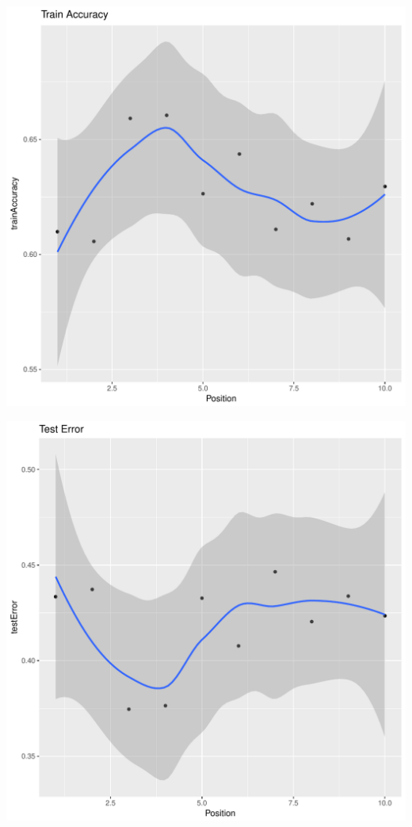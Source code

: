 \documentclass{article}\usepackage[]{graphicx}\usepackage[]{color}
\makeatletter
\def\maxwidth{ %
  \ifdim\Gin@nat@width>\linewidth
    \linewidth
  \else
    \Gin@nat@width
  \fi
}
\newenvironment{kframe}{%
 \def\at@end@of@kframe{}%
 \ifinner\ifhmode%
  \def\at@end@of@kframe{\end{minipage}}%
  \begin{minipage}{\columnwidth}%
 \fi\fi%
 \def\FrameCommand##1{\hskip\@totalleftmargin \hskip-\fboxsep
 \colorbox{shadecolor}{##1}\hskip-\fboxsep
     \hskip-\linewidth \hskip-\@totalleftmargin \hskip\columnwidth}%
 \MakeFramed {\advance\hsize-\width
   \@totalleftmargin\z@ \linewidth\hsize
   \@setminipage}}%
 {\par\unskip\endMakeFramed%
 \at@end@of@kframe}
\newenvironment{knitrout}{}{} %
\makeatother
\begin{document}
\begin{knitrout}
\begin{kframe}
{\ttfamily\noindent\itshape\color{messagecolor}{\#\# `geom\_smooth()` using method = 'loess'}}\end{kframe}
\includegraphics[width=\maxwidth]{figure/unnamed-chunk-35-4} 
\begin{kframe}

{\ttfamily\noindent\itshape\color{messagecolor}{\#\# `geom\_smooth()` using method = 'loess'}}\end{kframe}
\includegraphics[width=\maxwidth]{figure/unnamed-chunk-35-5} 
\begin{kframe}


\end{kframe}
\end{knitrout}
\end{document}
